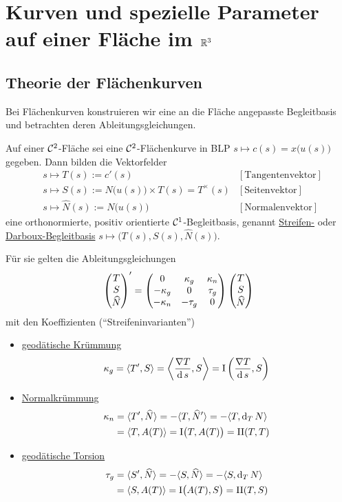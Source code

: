 \section{Kurven und spezielle Parameter auf einer Fläche im $\mathbb{R}^3$}

\subsection{Theorie der Flächenkurven}

Bei Flächenkurven konstruieren wir eine an die Fläche angepasste Begleitbasis und betrachten deren Ableitungsgleichungen.

\begin{satz}\label{satz241}
 Auf einer \(\mathcal{C}^2\)-Fläche sei eine \(\mathcal{C}^2\)-Flächenkurve in BLP \(s \mapsto c(s) = x\big(u(s)\big)\) gegeben. Dann bilden die Vektorfelder
 \begin{align*}
  &s \mapsto T(s) := c'(s) & [\text{Tangentenvektor}] \\
  &s \mapsto S(s) := N\big(u(s)\big) \times T(s) = T^{\times}(s) & [\text{Seitenvektor}] \\
  &s \mapsto \hat N(s) := N\big(u(s)\big) & [\text{Normalenvektor}]
 \end{align*}
 eine orthonormierte, positiv orientierte \(\mathcal{C}^1\)-Begleitbasis, genannt \uline{Streifen-} oder \uline{Darboux-Begleitbasis} \(s \mapsto \big(T(s), S(s), \widehat N(s)\big)\). \par
 Für sie gelten die Ableitungsgleichungen
 \[
  \begin{pmatrix} T \\ S \\ \widehat N \end{pmatrix} ' = \begin{pmatrix}
		      0 & \kappa_g & \kappa_n \\
		      -\kappa_g  & 0 & \tau_g \\
		      -\kappa_n   & -\tau_g & 0
		     \end{pmatrix} \begin{pmatrix} T \\ S \\ \widehat N \end{pmatrix} 
 \]
 mit den Koeffizienten ("`Streifeninvarianten"')
\begin{itemize}
 \item \uline{geodätische Krümmung}
  \[
   \kappa_g = \langle T', S \rangle = \left\langle \frac{\nabla T}{\dd s}, S \right\rangle = \Rom1 \left(\frac{\nabla T}{\dd s}, S\right)
  \]
  \item \uline{Normalkrümmung}
  \begin{align*}
   \kappa_n &= \langle T', \widehat N \rangle = - \langle T, \widehat N' \rangle = - \langle T, \dd_T N \rangle \\
    &= \langle T, A(T) \rangle = \Rom1 \big( T, A(T)\big) = \Rom2 (T,T)
  \end{align*}
  \item \uline{geodätische Torsion}
  \begin{align*}
   \tau_g &= \langle S', \widehat N \rangle = - \langle S, \widehat N \rangle = - \langle S, \dd_T N \rangle \\
   &=\langle S, A(T) \rangle = \Rom1 \big(A(T), S\big) = \Rom2 (T,S)
  \end{align*}
 \end{itemize}
\end{satz}

